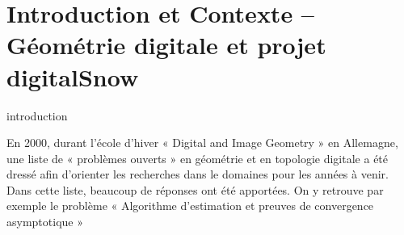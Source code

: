 %
\chapter{Introduction et Contexte -- Géométrie digitale et projet digitalSnow}
\label{sec:introduction}


\setcounter{minitocdepth}{3}
\minitoc

\newpage

introduction


En 2000, durant l'école d'hiver « Digital and Image Geometry » en Allemagne, une liste de « problèmes ouverts » en géométrie et en topologie digitale a été dressé\cite{Klette2000OpenProblems} afin d'orienter les recherches dans le domaines pour les années à venir. Dans cette liste, beaucoup de réponses ont été apportées. On y retrouve par exemple le problème « Algorithme d'estimation et preuves de convergence asymptotique »
